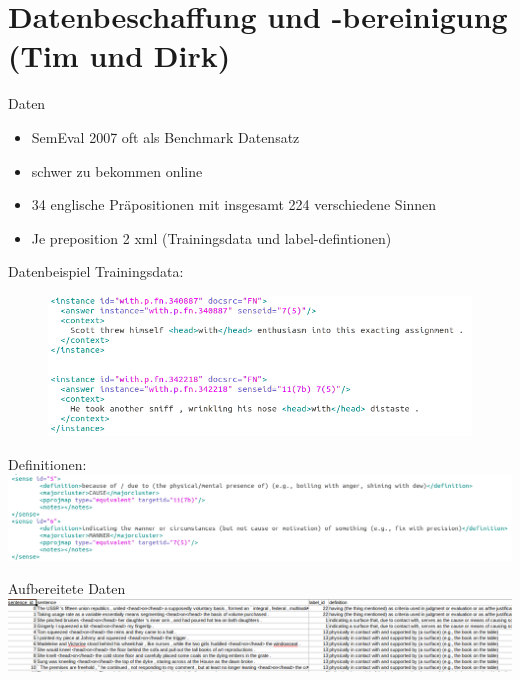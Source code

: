 \documentclass[xcolor=table]{beamer}
\begin{document}
\section{Datenbeschaffung und -bereinigung\\(Tim und Dirk)}
\begin{frame}[t]{Daten}
	\begin{itemize}
		\item SemEval 2007 oft als Benchmark Datensatz
		\item schwer zu bekommen online
		\item 34 englische Präpositionen mit insgesamt 224 verschiedene Sinnen
		\item Je preposition 2 xml (Trainingsdata und label-defintionen)
	\end{itemize}
\end{frame}

\begin{frame}[t]{Datenbeispiel}
Trainingsdata:
\begin{figure}
	\includegraphics[scale=0.3]{data_example.png}
\end{figure}
Definitionen:
\vspace*{.5cm}
\hspace*{-.8cm}
\includegraphics[scale=0.3]{def_example.png}
\end{frame}


\begin{frame}[t]{Aufbereitete Daten}\vspace{40pt}
	\hspace*{-0.75cm}
	\includegraphics[scale=0.3]{data_cleaned.png}
\end{frame}
\end{document}
